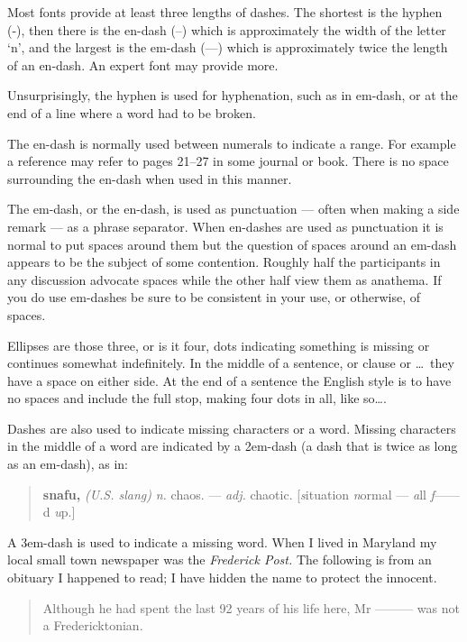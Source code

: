 \documentclass[10pt,a4paper,extrafontsizes]{memoir}
\begin{document}
\begin{paracol}{2}
\switchEng
    Most fonts provide at least three lengths of dashes. The shortest is
the hyphen (-), then there is the en-dash (--) which is approximately the
width of the letter `n', and the largest is the em-dash (---) which is
approximately twice the length of an en-dash. An expert font may provide
more.

   Unsurprisingly, the hyphen 
is used for hyphenation, such as in em-dash, or
at the end of a line where a word had to be broken.

    The en-dash 
is normally used between numerals to indicate a range. For
example a reference may refer to pages 21--27 in some journal or book. There
is no space surrounding the en-dash when used in this manner.

    The em-dash, 
or the en-dash, is used as punctuation --- often when making a side 
remark --- as a phrase separator.
 When en-dashes are used as punctuation it is normal to put spaces around them
but the question of spaces around an em-dash appears to be the subject of
some contention. Roughly half the participants in any discussion advocate
spaces while the other half view them as anathema. If you do use em-dashes
be sure to be consistent in your use, or otherwise, of spaces.

    Ellipses are those three, or is it four, 
dots indicating something is
missing or continues somewhat indefinitely. In the middle of a sentence,
or clause or \ldots\ they have a space on either side. At the end of
a sentence the English style is to have no spaces and include the full
stop, making four dots in all, like so\ldots.

   Dashes are also used to indicate missing characters or a word. Missing
characters in the middle of a word are indicated by a 
2em-dash (a dash that
is twice as long as an em-dash), as in:
\begin{quote}
\textbf{snafu,} \textit{(U.S. slang)} \textit{n.} chaos. --- \textit{adj.}
  chaotic. [\textit{s}ituation \textit{n}ormal --- \textit{a}ll
  \textit{f}------d \textit{u}p.]
\end{quote}
A 3em-dash is used to indicate a 
missing word. When I lived in Maryland my
local small town newspaper was the \textit{Frederick Post.} 
The following is from an 
obituary I happened to read; I have hidden the name to protect the 
innocent.
\begin{quote}
  Although he had spent the last 92 years of his life here, 
Mr --------- was not a Fredericktonian.
\end{quote}
\end{paracol}
\end{document}
